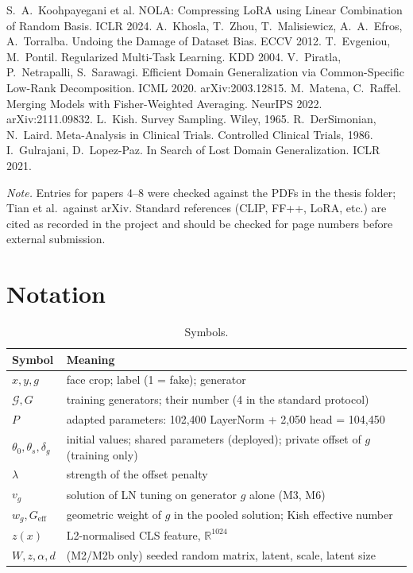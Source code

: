 \documentclass[10pt,a4paper]{article}
\begin{document}
\begin{thebibliography}{99}
 S.~A.~Koohpayegani et al. NOLA: Compressing LoRA using Linear Combination of Random Basis. ICLR 2024.
 A.~Khosla, T.~Zhou, T.~Malisiewicz, A.~A.~Efros, A.~Torralba. Undoing the Damage of Dataset Bias. ECCV 2012.
 T.~Evgeniou, M.~Pontil. Regularized Multi-Task Learning. KDD 2004.
 V.~Piratla, P.~Netrapalli, S.~Sarawagi. Efficient Domain Generalization via Common-Specific Low-Rank Decomposition. ICML 2020. arXiv:2003.12815.
 M.~Matena, C.~Raffel. Merging Models with Fisher-Weighted Averaging. NeurIPS 2022. arXiv:2111.09832.
 L.~Kish. Survey Sampling. Wiley, 1965.
 R.~DerSimonian, N.~Laird. Meta-Analysis in Clinical Trials. Controlled Clinical Trials, 1986.
 I.~Gulrajani, D.~Lopez-Paz. In Search of Lost Domain Generalization. ICLR 2021.
\end{thebibliography}
\textit{Note.} Entries for papers 4--8 were checked against the PDFs in the thesis folder; Tian et al.\
against arXiv. Standard references (CLIP, FF++, LoRA, etc.) are cited as recorded in the project and
should be checked for page numbers before external submission.

\appendix
\section{Notation}
\begin{table}[H]\centering\small
\caption{Symbols.}
\begin{tabularx}{\linewidth}{@{}lY@{}}
\toprule
Symbol & Meaning\\
\midrule
\(x, y, g\) & face crop; label (1 = fake); generator\\
\(\mathcal{G}, G\) & training generators; their number (4 in the standard protocol)\\
\(P\) & adapted parameters: 102,400 LayerNorm + 2,050 head = 104,450\\
\(\theta_0,\theta_s,\delta_g\) & initial values; shared parameters (deployed); private offset of \(g\) (training only)\\
\(\lambda\) & strength of the offset penalty\\
\(v_g\) & solution of LN tuning on generator \(g\) alone (M3, M6)\\
\(w_g, G_\text{eff}\) & geometric weight of \(g\) in the pooled solution; Kish effective number\\
\(z(x)\) & L2-normalised CLS feature, \(\mathbb{R}^{1024}\)\\
\(W, z, \alpha, d\) & (M2/M2b only) seeded random matrix, latent, scale, latent size\\
\bottomrule
\end{tabularx}
\end{table}
\end{document}
